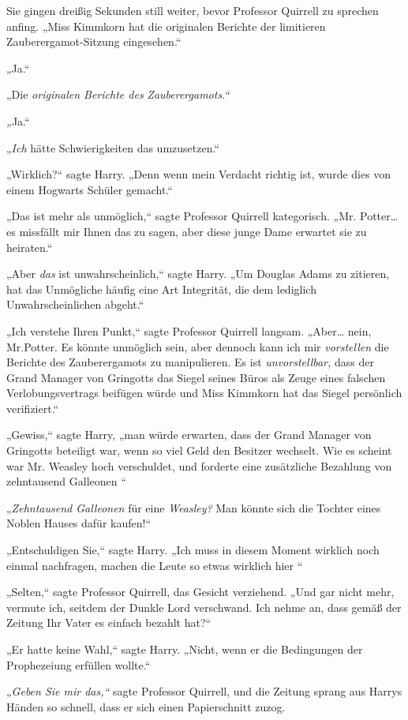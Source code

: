 {Sie gingen dreißig Sekunden still weiter, bevor Professor Quirrell zu sprechen anfing. „Miss Kimmkorn hat die originalen Berichte der limitieren Zauberergamot-Sitzung eingesehen.“

„Ja.“

„Die \emph{originalen Berichte des} \emph{Zauberergamots.“}

\emph{„}Ja.“

„\emph{Ich} hätte Schwierigkeiten das umzusetzen.“

„Wirklich?“ sagte Harry. „Denn wenn mein Verdacht richtig ist, wurde dies von einem Hogwarts Schüler gemacht.“

„Das ist mehr als unmöglich,“ sagte Professor Quirrell kategorisch. „Mr. Potter… es missfällt mir Ihnen das zu sagen, aber diese junge Dame erwartet sie zu heiraten.“

„Aber \emph{das} ist unwahrscheinlich,“ sagte Harry. „Um Douglas Adams zu zitieren, hat das Unmögliche häufig eine Art Integrität, die dem lediglich Unwahrscheinlichen abgeht.“

„Ich verstehe Ihren Punkt,“ sagte Professor Quirrell langsam. „Aber… nein, Mr.Potter. Es könnte unmöglich sein, aber dennoch kann ich mir \emph{vorstellen} die Berichte des Zauberergamots zu manipulieren. Es ist \emph{unvorstellbar,} dass der Grand Manager von Gringotts das Siegel seines Büros als Zeuge eines falschen Verlobungsvertrags beifügen würde und Miss Kimmkorn hat das Siegel persönlich verifiziert.“

„Gewiss,“ sagte Harry, „man würde erwarten, dass der Grand Manager von Gringotts beteiligt war, wenn so viel Geld den Besitzer wechselt. Wie es scheint war Mr. Weasley hoch verschuldet, und forderte eine zusätzliche Bezahlung von zehntausend Galleonen \later“

„\emph{Zehntausend Galleonen} für eine \emph{Weasley?} Man könnte sich die Tochter eines Noblen Hauses dafür kaufen!“

„Entschuldigen Sie,“ sagte Harry. „Ich muss in diesem Moment wirklich noch einmal nachfragen, machen die Leute so etwas wirklich hier \later“

„Selten,“ sagte Professor Quirrell, das Gesicht verziehend. „Und gar nicht mehr, vermute ich, seitdem der Dunkle Lord verschwand. Ich nehme an, dass gemäß der Zeitung Ihr Vater es einfach bezahlt hat?“

„Er hatte keine Wahl,“ sagte Harry. „Nicht, wenn er die Bedingungen der Prophezeiung erfüllen wollte.“

„\emph{Geben Sie mir das,“} sagte Professor Quirrell, und die Zeitung sprang aus Harrys Händen so schnell, dass er sich einen Papierschnitt zuzog.

}
